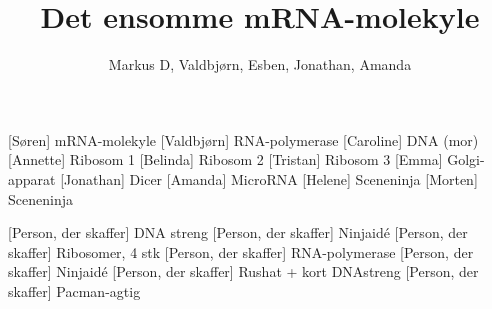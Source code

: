 \documentclass[a4paper,11pt]{article}
\title{Det ensomme mRNA-molekyle}
\author{Markus D, Valdbjørn, Esben, Jonathan, Amanda }
\begin{document}
\maketitle

\begin{roles}
    [Søren] mRNA-molekyle
    [Valdbjørn] RNA-polymerase
    [Caroline] DNA (mor)
    [Annette] Ribosom 1
    [Belinda] Ribosom 2
    [Tristan] Ribosom 3
    [Emma] Golgi-apparat
    [Jonathan] Dicer
    [Amanda] MicroRNA
    [Helene] Sceneninja
    [Morten] Sceneninja
\end{roles}

\begin{props}
    [Person, der skaffer] DNA streng
    [Person, der skaffer] Ninjaidé
    [Person, der skaffer] Ribosomer, 4 stk
    [Person, der skaffer] RNA-polymerase
    [Person, der skaffer] Ninjaidé
    [Person, der skaffer] Rushat + kort DNAstreng
    [Person, der skaffer] Pacman-agtig
\end{props}
\end{document}
